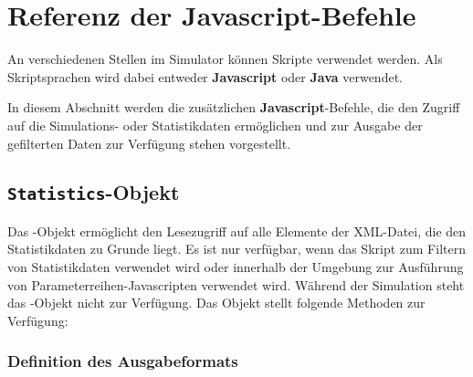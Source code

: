 \part{Referenz der Javascript-Befehle}

An verschiedenen Stellen im Simulator können Skripte verwendet werden.
Als Skriptsprachen wird dabei entweder \textbf{Javascript} oder \textbf{Java} verwendet.

In diesem Abschnitt werden die zusätzlichen \textbf{Javascript}-Befehle, die den
Zugriff auf die Simulations- oder Statistikdaten ermöglichen und zur Ausgabe
der gefilterten Daten zur Verfügung stehen vorgestellt.



\chapter{\texttt{Statistics}-Objekt}

Das -Objekt ermöglicht den Lesezugriff auf alle Elemente der XML-Datei, die den Statistikdaten
zu Grunde liegt. Es ist nur verfügbar, wenn das Skript zum Filtern von Statistikdaten verwendet wird oder innerhalb
der Umgebung zur Ausführung von Parameterreihen-Javascripten verwendet wird. Während der
Simulation steht das -Objekt nicht zur Verfügung. Das Objekt stellt folgende Methoden zur Verfügung:

\section{Definition des Ausgabeformats}

